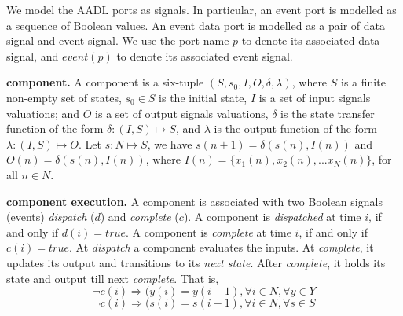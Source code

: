 We model the AADL ports as signals. In particular, an event port is modelled as a sequence of Boolean values. %
An event data port is modelled as a pair of data signal and event signal. We use the port name $p$ to denote its associated data signal, and $event(p)$ to denote its associated event signal. 

{\bf component.}
A component is a six-tuple $(S, s_0, I, O, \delta, \lambda)$, where $S$ is a finite non-empty set of states, $s_0 \in S$ is the initial state, $I$ is a set of input signals valuations; and $O$ is a set of output signals valuations, $\delta$ is the state transfer function of the form $\delta: (I, S) \mapsto S$, and $\lambda$ is the output function of the form $\lambda: (I,S) \mapsto O$. Let $s: N \mapsto S$, we have $ s(n+1) = \delta (s(n), I(n))$ and $ O(n) = \delta (s(n), I(n))$, where $I(n) = \{x_1(n), x_2(n), ... x_N(n)\}$, for all $n \in N$. 
 

{\bf component execution.}
A component is associated with two Boolean signals (events) \emph{dispatch} ($d$) and \emph{complete} ($c$). A component is \emph{dispatched} at time $i$, if and only if $d(i) = true$. A component is \emph{complete} at time $i$, if and only if $c(i) = true$. %
At \emph{dispatch} a component evaluates the inputs. At \emph{complete}, it updates its output and transitions to its \emph{next state}. After \emph{complete}, it holds its state and output till next \emph{complete}. That is,
$$\lnot c(i) \Rightarrow (y(i) = y(i-1), \forall i \in N, \forall y \in Y$$
$$\lnot c(i) \Rightarrow (s(i) = s(i-1), \forall i \in N, \forall s \in S$$


